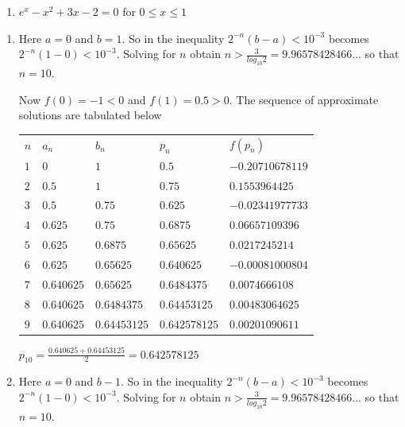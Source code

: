\begin{posttest}
\begin{enumerate}[label=(\alph*)]
\item $e^x-x^2+3x-2=0$ for $0\leq x\leq1$
\end{enumerate}
\begin{mysolution}
\begin{enumerate}[label=(\alph*)]
\item Here $a=0$ and $b=1$. So in the inequality $2^{-n}(b-a)<10^{-3}$ becomes $2^{-n}(1-0)<10^{-3}$. Solving for $n$ obtain $n>\frac{3}{log_{10}2}=9.96578428466\ldots$ so that $n=10$.

Now $f(0)=-1<0$ and $f(1)=0.5>0$. The sequence of approximate solutions are tabulated below
\begin{center}
\begin{tabular}{lllll}\hline
$n$&$a_n$&$b_n$&$p_n$&$f(p_n)$\\
$1$&$0$&$1$&$0.5$&$-0.20710678119$\\
$2$&$0.5$&$1$&$0.75$&$0.1553964425$\\
$3$&$0.5$&$0.75$&$0.625$&$-0.02341977733$\\
$4$&$0.625$&$0.75$&$0.6875$&$0.06657109396$\\
$5$&$0.625$&$0.6875$&$0.65625$&$0.0217245214$\\
$6$&$0.625$&$0.65625$&$0.640625$&$-0.00081000804$\\
$7$&$0.640625$&$0.65625$&$0.6484375$&$0.0074666108$\\
$8$&$0.640625$&$0.6484375$&$0.64453125$&$0.00483064625$\\
$9$&$0.640625$&$0.64453125$&$0.642578125$&$0.00201090611$\\\hline
\end{tabular}
\end{center}

\vspace{3mm}
$p_{10}=\frac{0.640625+0.64453125}{2}=0.642578125$
\item Here $a=0$ and $b-1$. So in the inequality $2^{-n}(b-a)<10^{-3}$ becomes $2^{-n}(1-0)<10^{-3}$. Solving for $n$ obtain $n>\frac{3}{log_{10}2}=9.96578428466\ldots$ so that $n=10$.


\end{enumerate}
\end{mysolution}
\end{posttest}
